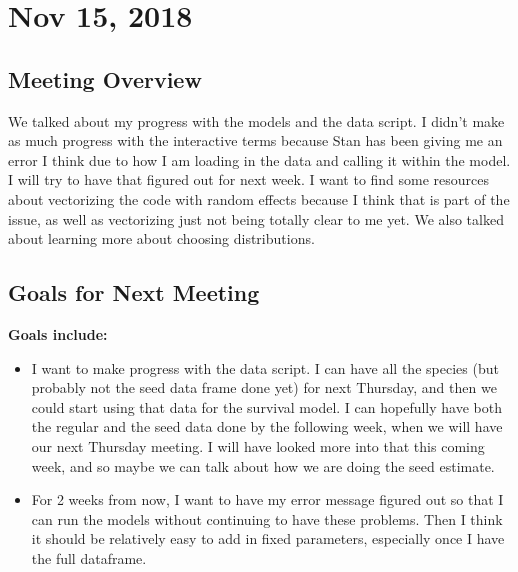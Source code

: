 \documentclass{article}
\newcommand{\tom}[1]{{\textit{\color{WildStrawberry}{[#1]}}}}
\begin{document}
\section*{Nov 15, 2018}
\tom{This all looks good to me. Coding up the interaction models in Stan may be the most challenging part so it is worth getting this sorted out soon. As you know, I have not done this myself, but I am certain we can figure it out together.}

\subsection*{Meeting Overview}

We talked about my progress with the models and the data script. I didn't make as much progress with the interactive terms because Stan has been giving me an error I think due to how I am loading in the data and calling it within the model. I will try to have that figured out for next week. I want to find some resources about vectorizing the code with random effects because I think that is part of the issue, as well as vectorizing just not being totally clear to me yet. We also talked about learning more about choosing distributions. 

\subsection*{Goals for Next Meeting}
\textbf{Goals include:}
\begin{itemize}
\item{I want to make progress with the data script. I can have all the species (but probably not the seed data frame done yet) for next Thursday, and then we could start using that data for the survival model. I can hopefully have both the regular and the seed data done by the following week, when we will have our next Thursday meeting. I will have looked more into that this coming week, and so maybe we can talk about how we are doing the seed estimate.} 
\item{For 2 weeks from now, I want to have my error message figured out so that I can run the models without continuing to have these problems. Then I think it should be relatively easy to add in fixed parameters, especially once I have the full dataframe.}
\end{itemize}
\end{document}
